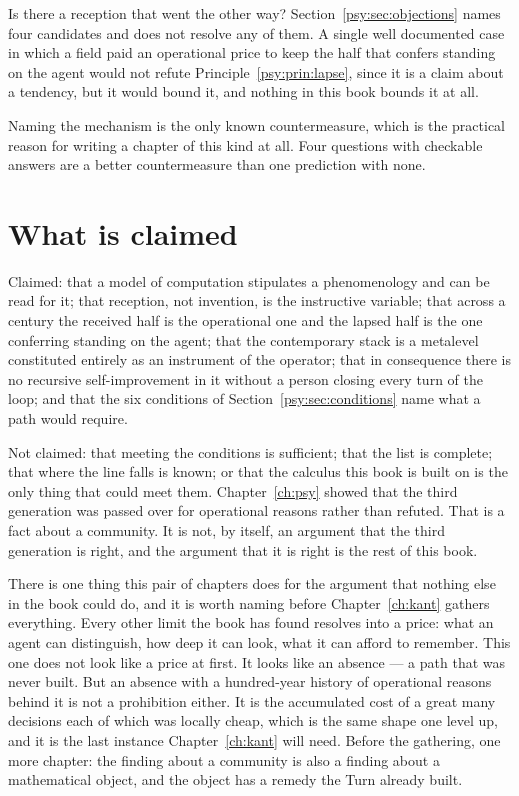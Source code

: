 \begin{question}
\label{psy:q:counterexample}
Is there a reception that went the other way?
Section~\ref{psy:sec:objections} names four candidates and does not
resolve any of them.
A single well documented case in which a field paid an operational
price to keep the half that confers standing on the agent would not
refute Principle~\ref{psy:prin:lapse}, since it is a claim about a
tendency, but it would bound it, and nothing in this book bounds it
at all.
\end{question}

Naming the mechanism is the only known countermeasure, which is the
practical reason for writing a chapter of this kind at all.
Four questions with checkable answers are a better countermeasure
than one prediction with none.

\section{What is claimed}
\label{psy:sec:psy-claims}

Claimed: that a model of computation stipulates a phenomenology and
can be read for it; that reception, not invention, is the
instructive variable; that across a century the received half is the
operational one and the lapsed half is the one conferring standing
on the agent; that the contemporary stack is a metalevel constituted
entirely as an instrument of the operator; that in consequence there
is no recursive self-improvement in it without a person closing
every turn of the loop; and that the six conditions of
Section~\ref{psy:sec:conditions} name what a path would require.

Not claimed: that meeting the conditions is sufficient; that the
list is complete; that where the line falls is known; or that the
calculus this book is built on is the only thing that could meet
them.
Chapter~\ref{ch:psy} showed that the third generation was passed
over for operational reasons rather than refuted.
That is a fact about a community.
It is not, by itself, an argument that the third generation is
right, and the argument that it is right is the rest of this book.

There is one thing this pair of chapters does for the argument that
nothing else in the book could do, and it is worth naming before
Chapter~\ref{ch:kant} gathers everything.
Every other limit the book has found resolves into a price: what an
agent can distinguish, how deep it can look, what it can afford to
remember.
This one does not look like a price at first.
It looks like an absence --- a path that was never built.
But an absence with a hundred-year history of operational reasons
behind it is not a prohibition either.
It is the accumulated cost of a great many decisions each of which
was locally cheap, which is the same shape one level up, and it is
the last instance Chapter~\ref{ch:kant} will need.
Before the gathering, one more chapter: the finding about a
community is also a finding about a mathematical object, and the
object has a remedy the Turn already built.
